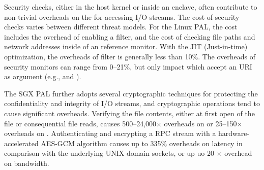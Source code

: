 Security checks, either in the host kernel or inside an enclave,
often contribute to
non-trivial overheads on the \hostapis{} for accessing I/O streams.
The cost of security checks
varies between different threat models.
For the Linux PAL, the cost includes the overhead of enabling a \seccomp{} filter, and the cost of checking file paths and network addresses
inside of an reference monitor.
With the JIT (Just-in-time) optimization,
the overheads of \seccomp{} filter is generally less than 10\%.
The overheads of security monitors can range from 0--21\%, but only impact \hostapis{} which accept an URI as argument (e.g.,  and ).

 
The SGX PAL further adopts several cryptographic techniques
for protecting the confidentiality and integrity of I/O streams, and cryptographic operations tend to cause significant overheads.
Verifying the file contents, either at first open of the file or consequential file reads,
causes 500--24,000$\times$ overheads on 
or 25--150$\times$ overheads on .
Authenticating and encrypting a RPC stream with a hardware-accelerated AES-GCM algorithm
causes up to 335\% overheads on latency in comparison with
the underlying UNIX domain sockets,
or up uo \roughly{}20 $\times$ overhead on bandwidth.


